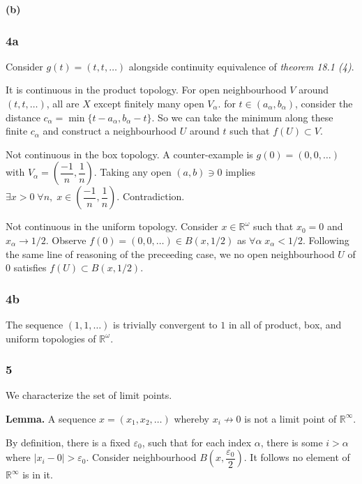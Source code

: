 \documentclass[12pt]{extarticle}
\begin{document}
\textbf{(b)}


\subsubsection{4a}

Consider $g(t) = (t, t, \dots)$ alongside continuity equivalence of \textit{theorem 18.1 (4)}.

It is continuous in the product topology. For open neighbourhood $V$ around $(t, t, \dots)$, all are $X$ except finitely many open $V_\alpha$. for $t \in (a_\alpha, b_\alpha)$, consider the distance $c_\alpha = \min \{ t-a_\alpha, b_\alpha-t \}$. So we can take the minimum along these finite $c_\alpha$ and construct a neighbourhood $U$ around $t$ such that $f(U) \subset V$.

Not continuous in the box topology. A counter-example is $g(0) = (0, 0, \dots)$ with $V_\alpha = \left ( \dfrac{-1}{n}, \dfrac{1}{n} \right )$. Taking any open $(a,b) \ni 0$ implies $\exists x > 0 \; \forall n, \; x \in \left ( \dfrac{-1}{n}, \dfrac{1}{n} \right )$. Contradiction.

Not continuous in the uniform topology. Consider $x \in \mathbb{R}^\omega$ such that $x_0 = 0$ and $x_\alpha \rightarrow 1/2$. Observe $f(0) = (0, 0, \dots) \in B(x, 1/2)$ as $\forall \alpha \; x_\alpha < 1/2$. Following the same line of reasoning of the preceeding case, we no open neighbourhood $U$ of $0$ satisfies $f(U) \subset B(x, 1/2)$.


\subsubsection{4b}

The sequence $(1, 1, \dots)$ is trivially convergent to $1$ in all of product, box, and uniform topologies of $\mathbb{R}^\omega$.


\subsubsection{5}

We characterize the set of limit points.


\textbf{Lemma.} A sequence $x = (x_1, x_2, \dots)$ whereby $x_i \not\rightarrow 0$ is not a limit point of $\mathbb{R}^\infty$.

By definition, there is a fixed $\varepsilon_0$, such that for each index $\alpha$, there is some $i > \alpha$ where $| x_i - 0 | > \varepsilon_0$. Consider neighbourhood $B \left (x, \dfrac{\varepsilon_0}{2} \right )$. It follows no element of $\mathbb{R}^\infty$ is in it.
\end{document}
